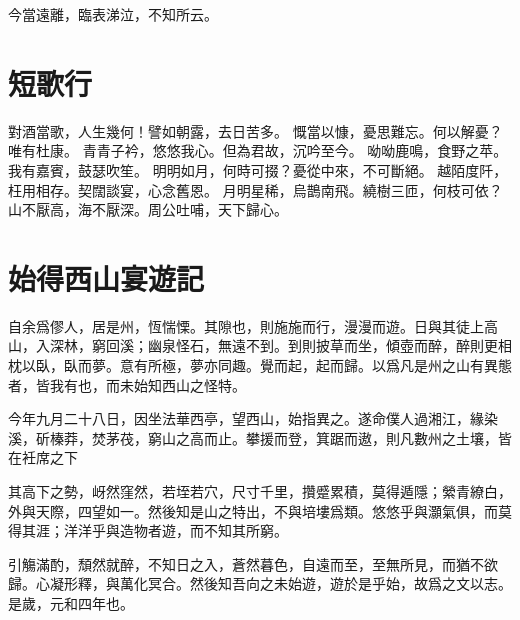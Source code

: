 今當遠離，臨表涕泣，不知所云。

\section{短歌行}

對酒當歌，人生幾何！譬如朝露，去日苦多。
慨當以慷，憂思難忘。何以解憂？唯有杜康。
青青子衿，悠悠我心。但為君故，沉吟至今。
呦呦鹿鳴，食野之苹。我有嘉賓，鼓瑟吹笙。
明明如月，何時可掇？憂從中來，不可斷絕。
越陌度阡，枉用相存。契闊談宴，心念舊恩。
月明星稀，烏鵲南飛。繞樹三匝，何枝可依？
山不厭高，海不厭深。周公吐哺，天下歸心。

\section{始得西山宴遊記}

自余爲僇人，居是州，恆惴慄。其隙也，則施施而行，漫漫而遊。日與其徒上高山，入深林，窮回溪；幽泉怪石，無遠不到。到則披草而坐，傾壺而醉，醉則更相枕以臥，臥而夢。意有所極，夢亦同趣。覺而起，起而歸。以爲凡是州之山有異態者，皆我有也，而未始知西山之怪特。

今年九月二十八日，因坐法華西亭，望西山，始指異之。遂命僕人過湘江，緣染溪，斫榛莽，焚茅茷，窮山之高而止。攀援而登，箕踞而遨，則凡數州之土壤，皆在衽席之下

其高下之勢，岈然窪然，若垤若穴，尺寸千里，攢蹙累積，莫得遁隱；縈青繚白，外與天際，四望如一。然後知是山之特出，不與培塿爲類。悠悠乎與灝氣俱，而莫得其涯；洋洋乎與造物者遊，而不知其所窮。

引觴滿酌，頹然就醉，不知日之入，蒼然暮色，自遠而至，至無所見，而猶不欲歸。心凝形釋，與萬化冥合。然後知吾向之未始遊，遊於是乎始，故爲之文以志。是歲，元和四年也。